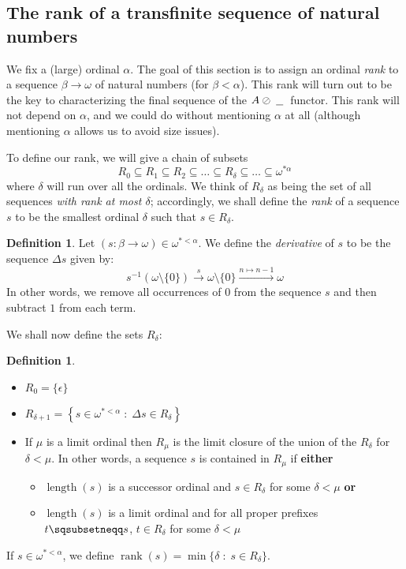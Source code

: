 \documentclass[11pt]{article} %
\theoremstyle{plain} %
\theoremstyle{definition} %
\newtheorem{definition}[theorem]{Definition}
\theoremstyle{note}
\theoremstyle{exercisestyle}
\newcommand*\from{\colon}
\def \inv {^{-1}}
\newcommand{\sequoid}{\oslash}
\newcommand{\suchthat}{\;\colon\;}
\newcommand{\emptyplay}{\epsilon}
\newcommand{\pprefix}{\sqsubsetneqq}
\DeclareMathOperator{\length}{length}
\newcommand{\blank}{\;\underline{\hspace{1.5ex}}\;}
\renewcommand{\subset}{\subseteq}
\DeclareMathOperator{\rank}{rank}
\begin{document}
\subsection{The rank of a transfinite sequence of natural numbers}

We fix a (large) ordinal $\alpha$.  The goal of this section is to assign an ordinal \emph{rank} to a sequence $\beta\to\omega$ of natural numbers (for $\beta<\alpha$).  This rank will turn out to be the key to characterizing the final sequence of the $A\sequoid\blank$ functor.  This rank will not depend on $\alpha$, and we could do without mentioning $\alpha$ at all (although mentioning $\alpha$ allows us to avoid size issues).  

To define our rank, we will give a chain of subsets 
\[
  R_0\subset R_1\subset R_2\subset\dots \subset R_\delta \subset\dots \subset \omega^{*\alpha}
  \]
where $\delta$ will run over all the ordinals.  We think of $R_\delta$ as being the set of all sequences \emph{with rank at most $\delta$}; accordingly, we shall define the \emph{rank} of a sequence $s$ to be the smallest ordinal $\delta$ such that $s\in R_\delta$.  

\begin{definition}
  Let $(s\from\beta\to\omega)\in\omega^{*<\alpha}$.  We define the \emph{derivative} of $s$ to be the sequence $\Delta s$ given by:
  \[
    s\inv\left(\omega\setminus\{0\}\right) \xrightarrow{s} \omega\setminus\{0\} \xrightarrow{n\mapsto n-1} \omega
    \]
  In other words, we remove all occurrences of $0$ from the sequence $s$ and then subtract $1$ from each term.  
\end{definition}

We shall now define the sets $R_\delta$:
\begin{definition}
  \begin{itemize}
    \item $R_0=\{\emptyplay\}$
    \item $R_{\delta+1}=\left\{s\in\omega^{*<\alpha}\suchthat \Delta s\in R_\delta\right\}$
    \item If $\mu$ is a limit ordinal then $R_\mu$ is the limit closure of the union of the $R_\delta$ for $\delta<\mu$.  In other words, a sequence $s$ is contained in $R_\mu$ if \textbf{either}
      \begin{itemize}
        \item $\length(s)$ is a successor ordinal and $s\in R_\delta$ for some $\delta<\mu$ \textbf{or}
        \item $\length(s)$ is a limit ordinal and for all proper prefixes $t\pprefix s$, $t\in R_\delta$ for some $\delta<\mu$
      \end{itemize}
  \end{itemize}

  If $s\in\omega^{*<\alpha}$, we define $\rank(s) = \min\{\delta\suchthat s\in R_\delta\}$.
\end{definition}
\end{document}
